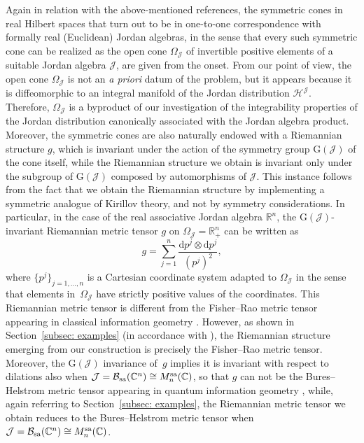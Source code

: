 \documentclass[pdftex]{sigma}
\numberwithin{equation}{section}
\newcommand{\hh}{\mathcal{H}}
\newcommand{\Jcal}{\mathcal{J}}
\newcommand{\G}{\mathrm{G}}
\begin{document}
Again in relation with the above-mentioned references, the symmetric cones in real Hilbert spaces that turn out to be in one-to-one correspondence with formally real (Euclidean) Jordan algebras, in the sense that every such symmetric cone can be realized as the open cone $\Omega_\Jcal$ of invertible positive elements of a suitable Jordan algebra $\Jcal$, are given from the onset.
From our point of view, the open cone $\Omega_\Jcal$ is not an {\itshape a priori} datum of the problem, but it appears because it is diffeomorphic to an integral manifold of the Jordan distribution $\hh^\Jcal$.
Therefore, $\Omega_\Jcal$ is a byproduct of our investigation of the integrability properties of the Jordan distribution canonically associated with the Jordan algebra product.
Moreover, the symmetric cones are also naturally endowed with a Riemannian structure $g$, which is invariant under the action of the symmetry group $\G(\Jcal)$ of the cone itself, while the Riemannian structure we obtain is invariant only under the subgroup of $\G(\Jcal)$ composed by automorphisms of $\Jcal$.
This instance follows from the fact that we obtain the Riemannian structure by implementing a symmetric analogue of Kirillov theory, and not by symmetry considerations.
In particular, in the case of the real associative Jordan algebra $\mathbb{R}^{n}$, the $\G(\Jcal)$-invariant Riemannian metric tensor $g$ on $\Omega_\Jcal=\mathbb{R}^{n}_{+}$ can be written as \cite[Theorem~2.3.19]{Chu-2012}
\[
g=\sum_{j=1}^{n}\frac{\mathrm{d}p^{j} \otimes \mathrm{d}p^{j}}{(p^{j})^{2}},
\]
where $\{p^{j}\}_{j=1,\dots,n}$ is a Cartesian coordinate system adapted to $\Omega_\Jcal$ in the sense that elements in~$\Omega_\Jcal$ have strictly positive values of the coordinates.
This Riemannian metric tensor is different from the Fisher--Rao metric tensor appearing in classical information geometry \cite{A-J-L-S-2017}.
However, as shown in Section~\ref{subsec: examples} (in accordance with \cite{C-J-S-2020}), the Riemannian structure emerging from our construction is precisely the Fisher--Rao metric tensor.
Moreover, the $\G(\Jcal)$ invariance of~$g$ implies it is invariant with respect to dilations also when $\Jcal = \mathcal{B}_{\rm sa}(\mathbb{C}^{n})\cong M_{n}^{\rm sa}(\mathbb{C})$, so that $g$ can not be the Bures--Helstrom metric tensor appearing in quantum information geometry \cite{Dittmann-1993}, while, again referring to Section~\ref{subsec: examples}, the Riemannian metric tensor we obtain reduces to the Bures--Helstrom metric tensor when $\Jcal = \mathcal{B}_{\rm sa}(\mathbb{C}^{n})\cong M_{n}^{\rm sa}(\mathbb{C})$.
\end{document}

